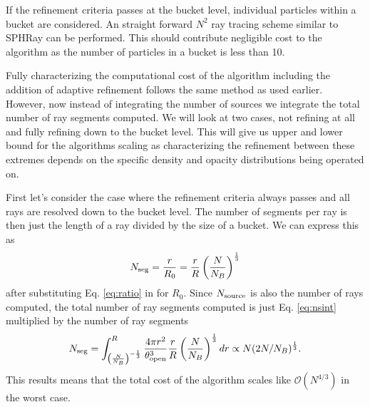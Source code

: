 \documentclass[fleq,usenatbib]{mnras}
\newcommand{\bigO}[1]{\mathcal{O}\left(#1\right)}
\newcommand{\NS}{N_{\rm source}}
\begin{document}
If the refinement criteria passes at the bucket level, individual particles 
within a bucket are considered. An straight forward $N^2$ ray tracing scheme 
similar to SPHRay \citep{altayEt08} can be performed. This should contribute 
negligible cost to the algorithm as the number of particles in a bucket is 
less than 10.

Fully characterizing the computational cost of the algorithm including the 
addition of adaptive refinement follows the same method as used earlier. 
However, now instead of integrating the number of sources we integrate the 
total number of ray segments computed. We will look at two cases, not refining 
at all and fully refining down to the bucket level. This will give us upper 
and lower bound for the algorithms scaling as characterizing the refinement 
between these extremes depends on the specific density and opacity 
distributions being operated on.

First let's consider the case where the refinement criteria always passes and 
all rays are resolved down to the bucket level. The number of segments per ray 
is then just the length of a ray divided by the size of a bucket. We can 
express this as
\begin{equation}
\label{eq:nseg}
N_{\rm seg} = \frac{r}{R_0} = \frac{r}{R}\left(\frac{N}{N_B}\right)^\frac{1}{3}
\end{equation}
after substituting Eq. \ref{eq:ratio} in for $R_0$. Since $\NS$ is also the 
number of rays computed, the total number of ray segments computed is just Eq. 
\ref{eq:nsint} multiplied by the number of ray segments
\begin{equation}
\label{eq:nsegint}
N_{\rm seg} = \int_{\left(\frac{N}{N_B}\right)^{-\frac{1}{3}}}^R 
\frac{4\pi r^2}{\theta_{\rm open}^3}
\frac{r}{R}\left(\frac{N}{N_B}\right)^\frac{1}{3} dr
\propto N(2N/N_B)^\frac{1}{3}.
\end{equation}
This results means that the total cost of the algorithm scales like 
$\bigO{N^{4/3}}$ in the worst case.
\end{document}
